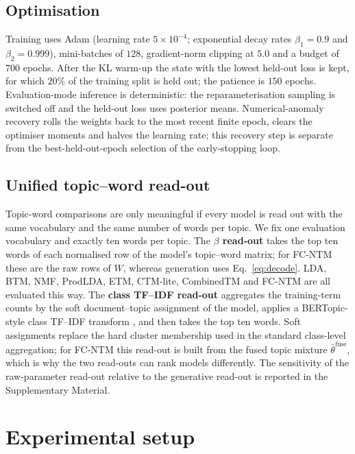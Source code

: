 \documentclass[pdflatex,sn-basic]{sn-jnl}
\newcommand{\fcntm}{FC-NTM}
\begin{document}
\subsection{Optimisation}
Training uses Adam (learning rate $5\times10^{-4}$; exponential decay rates $\beta_1=0.9$ and
$\beta_2=0.999$),
mini-batches of $128$, gradient-norm clipping at $5.0$ and a budget of $700$ epochs. After the KL
warm-up the state with the lowest held-out loss is kept, for which $20\%$ of the training split is
held out; the patience is $150$ epochs. Evaluation-mode inference is deterministic: the
reparameterisation sampling is switched off and the held-out loss uses posterior means.
Numerical-anomaly recovery rolls the weights back to the most recent finite epoch, clears the
optimiser moments and halves the learning rate; this recovery step is separate from the
best-held-out-epoch selection of the early-stopping loop.

\subsection{Unified topic--word read-out}
\label{sec:readout}

Topic-word comparisons are only meaningful if every model is read out with the same vocabulary and
the same number of words per topic. We fix one evaluation vocabulary and exactly ten words per
topic. The \textbf{$\beta$ read-out} takes the top ten words of each normalised row of the model's
topic--word matrix; for \fcntm{} these are the raw rows of $W$, whereas generation uses
Eq.~\eqref{eq:decode}. LDA, BTM, NMF, ProdLDA, ETM, CTM-lite, CombinedTM and \fcntm{} are all
evaluated this way. The \textbf{class TF--IDF read-out} aggregates the training-term counts by the
soft document--topic assignment of the model, applies a BERTopic-style class TF--IDF transform
\cite{grootendorst2022bertopic}, and then takes the top ten words. Soft assignments replace the
hard cluster membership used in the standard class-level aggregation; for \fcntm{} this read-out
is built from the fused topic mixture $\bar\theta^{\mathrm{fuse}}$, which is why the two read-outs
can rank models differently. The sensitivity of the raw-parameter read-out relative to the
generative read-out is reported in the Supplementary Material.

\section{Experimental setup}
\label{sec:setup}
\end{document}
